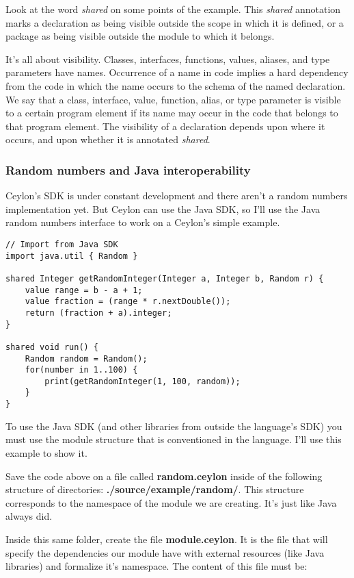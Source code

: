 \documentclass{abnt}
\begin{document}
Look at the word \textit{shared} on some points of the example. This \textit{shared}
annotation marks a declaration as being visible outside the scope in which it is
defined, or a package as being visible outside the module to which it
belongs\cite{1_6}.

It's all about visibility\cite{1_7}. Classes, interfaces, functions, values,
aliases, and type parameters have names. Occurrence of a name in code implies a
hard dependency from the code in which the name occurs to the schema of the
named declaration. We say that a class, interface, value, function, alias, or
type parameter is visible to a certain program element if its name may occur in
the  code that belongs to that program element. The visibility of a declaration
depends upon where it occurs, and upon whether it is annotated \textit{shared}. 

\subsubsection{Random numbers and Java interoperability}

Ceylon's SDK is under constant development\cite{1_8} and there aren't a random
numbers implementation yet. But Ceylon can use the Java SDK, so I'll use the
Java random numbers interface to work on a Ceylon's simple example.

\begin{lstlisting}[label=w1,caption=Random number from Java]
// Import from Java SDK
import java.util { Random }

shared Integer getRandomInteger(Integer a, Integer b, Random r) {
	value range = b - a + 1;
	value fraction = (range * r.nextDouble());
	return (fraction + a).integer;
}

shared void run() {
    Random random = Random();
    for(number in 1..100) {
        print(getRandomInteger(1, 100, random));
    }
}
\end{lstlisting}

To use the Java SDK (and other libraries from outside the language's SDK) you
must use the module structure that is conventioned in the language. I'll use
this example to show it.

Save the code above on a file called \textbf{random.ceylon} inside of the
following structure of directories: \textbf{./source/example/random/}. This
structure corresponds to the namespace of the module we are creating. It's just
like Java always did.

Inside this same folder, create the file \textbf{module.ceylon}. It is the file
that will specify the dependencies our module have with external resources (like
Java libraries) and formalize it's namespace. The content of this file must be:
\end{document}
